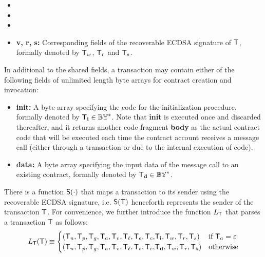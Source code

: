 \begin{itemize} [nosep]
	\item {}

	\item {}

	\item {} 

	\item {\bf v, r, s:} Corresponding fields of the recoverable ECDSA signature of $\textsf{T}$, formally denoted by $\textsf{T}_w$, $\textsf{T}_r$ and $\textsf{T}_s$. 
\end{itemize}

\smallskip
In additional to the shared fields, 
a transaction may contain either of the following fields of unlimited length byte arrays for contract creation and invocation:
\begin{itemize}[nosep]
 	\item {\bf init:} A byte array specifying the \cvm code for the initialization procedure, formally denoted by $\textsf{T}_{\bf i} \in \mathbb{BY}^*$.
 	Note that {\bf init} is executed once and discarded thereafter, and it returns another code fragment {\bf body} as the actual contract code that will be executed each time the contract account receives a message call (either through a transaction or due to the internal execution of code).


 	\item {\bf data:} A byte array specifying the input data of the message call to an existing contract, formally denoted by $\textsf{T}_{\bf d}\in \mathbb{BY}^*$.

 \end{itemize} 

There is a function $\mathsf{S}{\left({\cdot} \right)}$ that maps a transaction to its sender using the recoverable ECDSA signature,
i.e. $\mathsf{S}{\left({\textsf{T}} \right)}$ henceforth represents the sender of the transaction $\textsf{T}$.
% 
For convenience, we further introduce the function $L_{\textsf{T}}$ that parses a transaction $\textsf{T}$ as follows:
\begin{align}\label{def:tx_prepare}
	L_{\textsf{T}}(\textsf{T})\equiv 
	\begin{cases}
	\left(\textsf{T}_n, \textsf{T}_p, \textsf{T}_g, \textsf{T}_a, \textsf{T}_v, {\textsf{T}_\ell,\textsf{T}_e,\textsf{T}_c,} \textsf{T}_{\bf i}, \textsf{T}_w,\textsf{T}_r,\textsf{T}_s \right) & \mbox{if $\textsf{T}_a=\mathbb{\varepsilon}$} \\
	\left(\textsf{T}_n, \textsf{T}_p, \textsf{T}_g, \textsf{T}_a, \textsf{T}_v, {\textsf{T}_\ell,\textsf{T}_e,\textsf{T}_c,} \textsf{T}_{\bf d}, \textsf{T}_w,\textsf{T}_r,\textsf{T}_s \right) & \mbox{otherwise}
	\end{cases}
\end{align}

